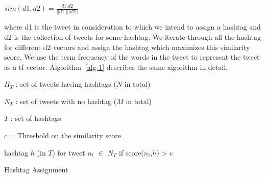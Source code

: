 \documentclass[10pt,a5paper,twoside]{article}
\newcommand{\var}{v}
\begin{document}
\begin{center}
$sim(d1,d2) = \frac{d1 . d2}{||d1|| ||d2||}$
\end{center}

where d1 is the tweet in consideration to which we intend to assign a hashtag and d2 is the collection of tweets for some hashtag. We iterate through all the hashtag for different d2 vectors and assign the hashtag which maximizes this similarity score. We use the term frequency of the words in the tweet to represent the tweet as a tf vector. Algorithm~\ref{alg-1} describes the same algorithm in detail.


\incmargin{1.5em}
\linesnumbered
\begin{algorithm}[hb!]
\dontprintsemicolon

\Input
{
$H_T$ : set of tweets having hashtags ($N$ in total)
 
$N_T$ : set of tweets with no hashtag ($M$ in total)
 
$T$ : set of hashtags
 
$c$ = \footnotesize{Threshold} on the similarity score
}
\Output
{
hashtag $h$ (in $T$) for tweet $n_t$ $\in$ $N_T$ if score($n_t$,$h$) > c
}
\BlankLine
{\small
{}
}
\caption{{\sc Hashtag Assignment} \label{alg-1}}
\end{algorithm}
\decmargin{1.5em}
\end{document}

